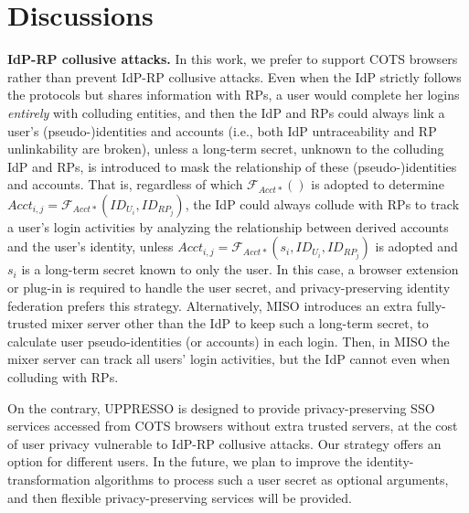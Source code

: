 \section{Discussions}
\label{sec:discussion}

\noindent \textbf{IdP-RP collusive attacks.} 
In this work, we prefer to support COTS browsers rather than prevent IdP-RP collusive attacks.
Even when the IdP strictly follows the protocols but shares information with RPs,
    a user would complete her logins \emph{entirely} with colluding entities,
    and then the IdP and RPs could always link a user's (pseudo-)identities and accounts (i.e., both IdP untraceability and RP unlinkability are broken),
    unless a long-term secret, unknown to the colluding IdP and RPs,
                is introduced to mask the relationship of these (pseudo-)identities and accounts.
That is, regardless of which $\mathcal{F}_{Acct\ast}()$ is adopted to determine
$Acct_{i,j} = \mathcal{F}_{Acct\ast}(ID_{U_i}, ID_{RP_j})$,
the IdP could always collude with RPs to track a user's login activities by analyzing the relationship between derived accounts and the user's identity,
unless $Acct_{i,j} = \mathcal{F}_{Acct\ast}(s_i,ID_{U_i}, ID_{RP_j})$ is adopted and $s_i$ is a long-term secret known to only the user.
In this case,
    a browser extension or plug-in is required
            to handle the user secret,
             and privacy-preserving identity federation \cite{ELPASSO, UnlimitID, idemix, PseudoID, uprov} prefers this strategy.
Alternatively, MISO \cite{miso} introduces an extra fully-trusted mixer server other than the IdP to keep such a long-term secret,
            to calculate user pseudo-identities (or accounts) in each login.
Then, in MISO the mixer server can track all users' login activities,
    but the IdP cannot even when colluding with RPs.

On the contrary,
    UPPRESSO is designed to provide privacy-preserving SSO services accessed from COTS browsers without extra trusted servers,
        at the cost of user privacy vulnerable to IdP-RP collusive attacks.
Our strategy offers an option for different users.
In the future, we plan to improve the identity-transformation algorithms
    to process such a user secret as optional arguments,
    and then flexible privacy-preserving services will be provided.

